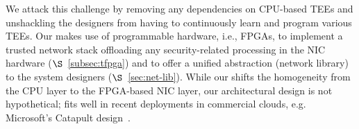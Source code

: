 

 We attack this challenge by removing any dependencies on CPU-based TEEs and unshackling the designers from having to continuously learn and program various TEEs. Our \projecttitle{} makes use of programmable hardware, i.e., FPGAs, to implement a trusted network stack offloading any security-related processing in the NIC hardware ($\S$~\ref{subsec:tfpga}) and to offer a unified abstraction (network library) to the system designers ($\S$~\ref{sec:net-lib}). While our \projecttitle{} shifts the homogeneity from the CPU layer to the FPGA-based NIC layer, our architectural design is not hypothetical; \projecttitle{} fits well in recent deployments in commercial clouds, e.g. Microsoft's Catapult design~\cite{msr_smartnics, 211249}. 


